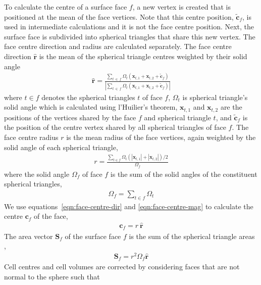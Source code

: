 To calculate the centre of a surface face $f$, a new vertex is created that is positioned at the mean of the face vertices.  Note that this centre position, $\mathbf{\tilde{c}}_f$, is used in intermediate calculations and it is not the face centre position.
Next, the surface face is subdivided into spherical triangles that share this new vertex.
The face centre direction and radius are calculated separately.  The face centre direction $\mathbf{\hat{r}}$ is the mean of the spherical triangle centres weighted by their solid angle
\begin{align}
	\mathbf{\hat{r}} = \frac
	{\sum_{t\:\in\:f}{\Omega_t \left(\mathbf{x}_{t,1} + \mathbf{x}_{t,2} + \mathbf{\tilde{c}}_f \right)}}
	{\left\lvert \sum_{t\:\in\:f}{\Omega_t \left(\mathbf{x}_{t,1} + \mathbf{x}_{t,2} + \mathbf{\tilde{c}}_f \right)} \right\rvert} \label{eqn:face-centre-dir}
\end{align}
where $t\in f$ denotes the spherical triangles $t$ of face $f$, $\Omega_t$ is spherical triangle's solid angle which is calculated using l'Huilier's theorem, $\mathbf{x}_{t,1}$ and $\mathbf{x}_{t,2}$ are the positions of the vertices shared by the face $f$ and spherical triangle $t$, and $\mathbf{\tilde{c}}_f$ is the position of the centre vertex shared by all spherical triangles of face $f$.
The face centre radius $r$ is the mean radius of the face vertices, again weighted by the solid angle of each spherical triangle,
\begin{align}
	r = \frac
	{\sum_{t\in f}{\Omega_t \left(\left\lvert \mathbf{x}_{t,1} \right\rvert + \left\lvert \mathbf{x}_{t,2} \right\rvert \right)/2}}
	{\Omega_f} \label{eqn:face-centre-mag}
\end{align}
where the solid angle $\Omega_f$ of face $f$ is the sum of the solid angles of the constituent spherical triangles,
\begin{align}
	\Omega_f = \sum_{t\in f}{\Omega_t}
\end{align}
We use equations~\eqref{eqn:face-centre-dir} and \eqref{eqn:face-centre-mag} to calculate the centre $\mathbf{c}_f$ of the face,
\begin{align}
	\mathbf{c}_f = r\:\mathbf{\hat{r}}
\end{align}
The area vector $\mathbf{S}_f$ of the surface face $f$ is the sum of the spherical triangle areas \citep{vanbrummelen2013},
\begin{align}
	\mathbf{S}_f = r^2 \Omega_f \mathbf{\hat{r}}
\end{align}
Cell centres and cell volumes are corrected by considering faces that are not normal to the sphere such that
